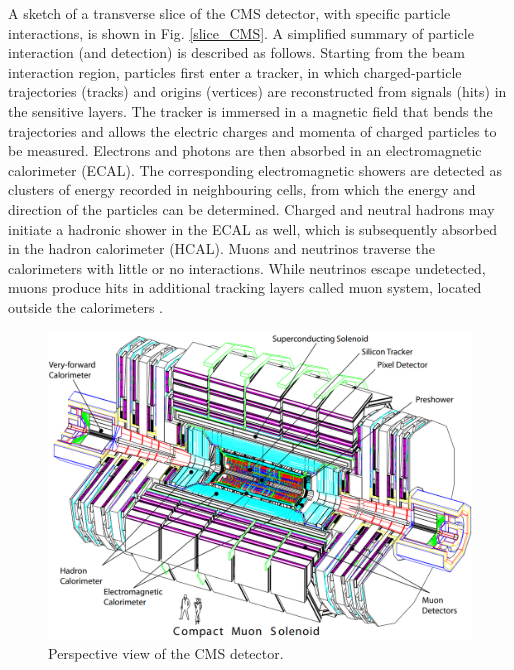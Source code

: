 A sketch of a transverse slice of the CMS detector, with specific particle interactions, is shown in Fig. \ref{slice_CMS}. A simplified summary of particle interaction (and detection) is described as follows. Starting from the beam interaction region, particles first enter a tracker, in which charged-particle trajectories (tracks) and origins (vertices) are reconstructed from signals (hits) in the sensitive layers. The tracker is immersed in a magnetic field that bends the trajectories and allows the electric charges and momenta of charged particles to be measured. Electrons and photons are then absorbed in an electromagnetic calorimeter (ECAL). The corresponding electromagnetic showers are detected as clusters of energy recorded in neighbouring cells, from which the energy and direction of the particles can be determined. Charged and neutral hadrons may initiate a hadronic shower in the ECAL as well, which is subsequently absorbed in the hadron calorimeter (HCAL). Muons and neutrinos traverse the calorimeters with little or no interactions. While neutrinos escape undetected, muons produce hits in additional tracking layers called muon system, located outside the calorimeters \cite{det_summary}.\\
\begin{center}
  \begin{figure}[ht]
    \centering
    \includegraphics[scale=.3]{Chapter2/CMS_detector_simple.png}
    \caption[Perspective view of the CMS detector]{Perspective view of the CMS detector.}
    \label{detector_CMS}
  \end{figure}
\end{center}

